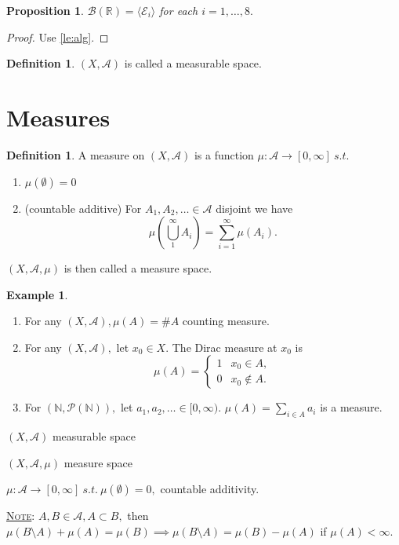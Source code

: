 \documentclass{report}
\newcommand{\R}{\mathbb{R}}
\newcommand{\N}{\mathbb{N}}
\newcommand{\st}{\ s.t.\ }
\newcommand{\fancyem}[1]{\underline{\textsc{#1}}}
\newtheorem{proposition}[theorem]{Proposition}
\theoremstyle{definition}
\newtheorem{definition}[theorem]{Definition}
\newtheorem{example}[theorem]{Example}
\theoremstyle{remark}
\begin{document}
\begin{proposition}
$\mathcal{B}(\R) = \langle\mathcal{E}_i\rangle$ for each $i = 1, \ldots, 8.$ 
\end{proposition}
\begin{proof}
Use \ref{le:alg}.
\end{proof}

\begin{definition}
$(X, \mathcal{A})$ is called a measurable space.
\end{definition}


\section{Measures}
\begin{definition}
A measure on $(X, \mathcal{A})$ is a function $\mu: \mathcal{A} \to [0, \infty] \st$
\begin{enumerate}
\item $\mu(\emptyset) = 0$
\item (countable additive) For $A_1, A_2, \ldots \in \mathcal{A}$ disjoint we have
\[
\mu\left(\bigcup_1^\infty A_i \right) = \sum_{i=1}^\infty \mu(A_i).
\]
\end{enumerate}
$(X,  \mathcal{A}, \mu)$ is then called a measure space.
\end{definition}

\begin{example}
\begin{enumerate}
\item For any $(X, \mathcal{A}), \mu(A) = \#A$ counting measure.
\item For any $(X, \mathcal{A}),$ let $x_0 \in X.$ The Dirac measure at $x_0$ is
\[
\mu(A) = \begin{cases}
1 & x_0 \in A, \\
0 & x_0 \notin A.
\end{cases}
\]
\item For $(\N, \mathcal{P}(\N)),$ let $a_1, a_2, \ldots \in [0, \infty).$ $\mu(A) = \sum_{i \in A} a_i$ is a measure.
\end{enumerate}
\end{example}

$(X,  \mathcal{A})$ measurable space

$(X,  \mathcal{A}, \mu)$ measure space

$\mu: \mathcal{A} \to [0, \infty] \st \mu(\emptyset) = 0, $ countable additivity.

\fancyem{Note}: $A, B \in \mathcal{A}, A \subset B, $ then $ \mu(B \setminus A) + \mu(A) = \mu(B) \implies \mu(B \setminus A) = \mu(B) - \mu(A)$ if $\mu(A) < \infty.$
\end{document}

